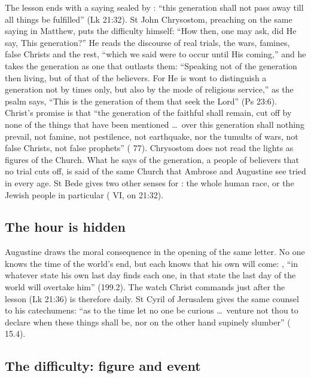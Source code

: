 The lesson ends with a saying sealed by : ``this generation shall
not pass away till all things be fulfilled'' (Lk 21:32). St John Chrysostom,
preaching on the same saying in Matthew, puts the difficulty himself: ``How
then, one may ask, did He say, This generation?'' He reads the discourse of
real trials, the wars, famines, false Christs and the rest, ``which we said
were to occur until His coming,'' and he takes the generation as one that
outlasts them: ``Speaking not of the generation then living, but of that of
the believers. For He is wont to distinguish a generation not by times only,
but also by the mode of religious service,'' as the psalm says, ``This is the
generation of them that seek the Lord'' (Ps 23:6). Christ's promise is that
``the generation of the faithful shall remain, cut off by none of the things
that have been mentioned \dots\ over this generation shall nothing prevail,
not famine, not pestilence, not earthquake, nor the tumults of wars, not false
Christs, not false prophets'' ( 77). Chrysostom does
not read the lights as figures of the Church. What he says of the generation, a
people of believers that no trial cuts off, is said of the same Church that
Ambrose and Augustine see tried in every age. St Bede gives two other senses for : the
whole human race, or the Jewish people in particular ( VI, on 21:32).

\subsection{The hour is hidden}

Augustine draws the moral consequence in the opening of the same letter. No
one knows the time of the world's end, but each knows that his own will come:
, ``in whatever state his own last day
finds each one, in that state the last day of the world will overtake him''
(199.2). The watch Christ commands just after the lesson (Lk 21:36) is
therefore daily. St Cyril of
Jerusalem gives the same counsel to his catechumens: ``as to the time let no
one be curious \dots\ venture not thou to declare when these things shall
be, nor on the other hand supinely slumber'' (
15.4).

\subsection{The difficulty: figure and event}

